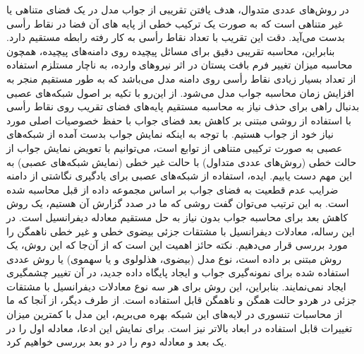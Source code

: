 در روش‌های عددی متدوال، هدف یافتن تقریبی از جواب مدل در یک فضای متناهی یا غیر متناهی است که به صورت یک ترکیب خطی از پایه های آن فضا در نقاط رأسی بدست می‌آید. دقت این تقریب با تعداد نقاط رأسی به کار رفته رابطه مستقیم دارد. بنابراین، محاسبه تقریبی دقیق برای مسائل پیچیده روی دامنه‌های پیچیده، همچون محاسبه میزان تغییر فرم بافت پستان در اثر نیروهای وارده، به ناچار مستلزم استفاده از تعداد بسیار زیادی نقاط رأسی روی دامنه مدل می‌باشد که به طور مستقیم منجر به افزایش زمان محاسبه جواب مدل می‌شود. از این‌رو  با تکیه بر اصول شبکه‌های عصبی بدنبال راهی برای حذف نیاز به محاسبه مستقیم پایه‌های فضای تقریب روی نقاط رأسی با استفاده از روشی مبتنی بر کاهش بعد فضای جواب با حفظ خصوصیات اصلی مورد نیاز خود از جواب هستیم. با توجه به اینکه نمایش جواب بدست آمده از شبکه‌های عصبی به صورت ترکیبی متناهی از توابع است، می‌توانیم با تعویض نمایش جواب از حالت خطی (روش‌های عددی متداول) با حالت غیر خطی (نمایش شبکه‌های عصبی) به این مهم دست یابیم. ایده، استفاده از شبکه‌های عصبی برای یادگیری نگاشتی از دامنه ضرایب عدم قطعیت به فضای جواب بر اساس مجموعه داده‌ از قبل محاسبه شده است. به این ترتیب می‌توان گفت روشی که ما در صدد گزارش آن هستیم، یک روش کاهش بعد برای محاسبه جواب بدون نیاز به حل مستقیم معادله دیفرانسیل است. در این رساله، معادلات دیفرانسیل با مشتقات جزئی بیضوی خطی و غیر خطی ناهمگن را مورد بررسی قرار می‌دهیم. نکته حائز اهمیت این است که از آن‌جا که این روش، یک روش مبتنی بر داده است، نوع مدل (بیضوی، هذلولوی و یا سهموی) یا روش عددی استفاده شده برای نمونه‌گیری جواب و ایجاد پایگاه داده جدید، در آن تغییر چشمگیری ایجاد نمی‌نمایند. بنابراین، این روش برای هر سه نوع معادلات دیفرانسیل با مشتقات جزئی در هردو حالت همگن و ناهمگن قابل استفاده است. از طرف دیگر، از آنجا که ما از محاسبات تنسوری در لایه‌های این شبکه بهره می‌بریم، این مدل با کمترین میزان تغییرات قابل استفاده در ابعاد بالاتر نیز است. برای نمایش این ادعا، معادله اول را در یک بعد و معادله دوم را در دو بعد بررسی خواهیم کرد.
